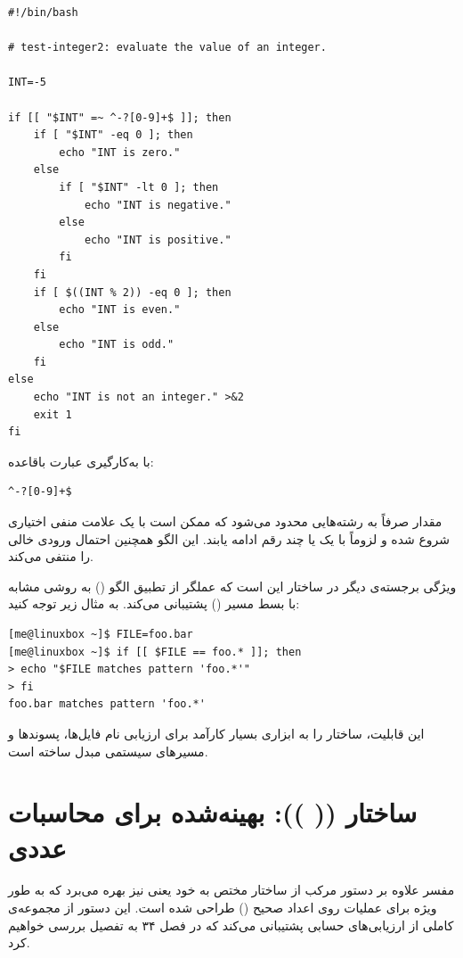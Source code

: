 \begin{latin}
\begin{lstlisting}
#!/bin/bash

# test-integer2: evaluate the value of an integer.

INT=-5

if [[ "$INT" =~ ^-?[0-9]+$ ]]; then
    if [ "$INT" -eq 0 ]; then
        echo "INT is zero."
    else
        if [ "$INT" -lt 0 ]; then
            echo "INT is negative."
        else
            echo "INT is positive."
        fi
    fi
    if [ $((INT % 2)) -eq 0 ]; then
        echo "INT is even."
    else
        echo "INT is odd."
    fi
else
    echo "INT is not an integer." >&2
    exit 1
fi
\end{lstlisting}
\end{latin}

با به‌کارگیری عبارت باقاعده:

\begin{latin}
\begin{lstlisting}
^-?[0-9]+$
\end{lstlisting}
\end{latin}

مقدار  صرفاً به رشته‌هایی محدود می‌شود که ممکن است با یک علامت منفی اختیاری شروع شده و لزوماً با یک یا چند رقم ادامه یابند. این الگو همچنین احتمال ورودی خالی را منتفی می‌کند.

ویژگی برجسته‌ی دیگر در ساختار \cmd{[[ ]]} این است که عملگر \cmd{==} از تطبیق الگو () به روشی مشابه با بسط مسیر () پشتیبانی می‌کند. به مثال زیر توجه کنید:

\begin{latin}
\begin{lstlisting}
[me@linuxbox ~]$ FILE=foo.bar
[me@linuxbox ~]$ if [[ $FILE == foo.* ]]; then
> echo "$FILE matches pattern 'foo.*'"
> fi
foo.bar matches pattern 'foo.*'
\end{lstlisting}
\end{latin}

این قابلیت، ساختار \cmd{[[ ]]} را به ابزاری بسیار کارآمد برای ارزیابی نام فایل‌ها، پسوندها و مسیرهای سیستمی مبدل ساخته است.

\section{ساختار (( )): بهینه‌شده برای محاسبات عددی}

مفسر  علاوه بر دستور مرکب \cmd{[[ ]]} از ساختار مختص به خود یعنی \cmd{(( ))} نیز بهره می‌برد که به طور ویژه برای عملیات روی اعداد صحیح () طراحی شده است. این دستور از مجموعه‌ی کاملی از ارزیابی‌های حسابی پشتیبانی می‌کند که در فصل ۳۴ به تفصیل بررسی خواهیم کرد.

